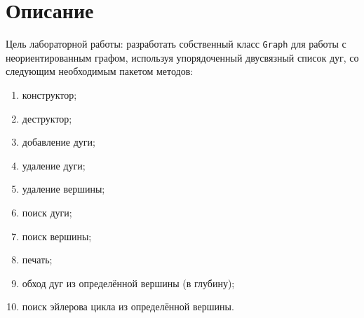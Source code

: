 \section{Описание}\label{sec:description}


Цель лабораторной работы: разработать собственный класс \texttt{Graph} для работы с неориентированным графом, используя упорядоченный двусвязный список дуг, со следующим необходимым пакетом методов:
\begin{enumerate}
    \item конструктор;
    \item деструктор;
    \item добавление дуги;
    \item удаление дуги;
    \item удаление вершины;
    \item поиск дуги;
    \item поиск вершины;
    \item печать;
    \item обход дуг из определённой вершины (в глубину);
    \item поиск эйлерова цикла из определённой вершины.
\end{enumerate}

\newpage
